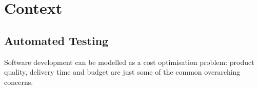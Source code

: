\section{Context}
\label{sec:context}


\subsection{Automated Testing}
\label{sec:sec:automated_testing}

Software development can be modelled as a cost optimisation problem: product quality, delivery time and budget are just some of the common overarching concerns.

